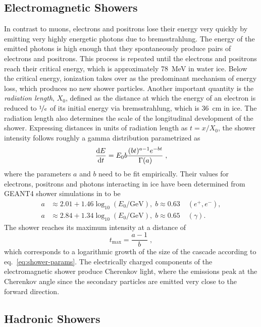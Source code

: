 \subsection{Electromagnetic Showers}

In contrast to muons, electrons and positrons lose their energy very quickly by emitting very highly energetic photons due to bremsstrahlung. The energy of the emitted photons is high enough that they spontaneously produce pairs of electrons and positrons. This process is repeated until the electrons and positrons reach their critical energy, which is approximately 78~MeV in water ice. Below the critical energy, ionization takes over as the predominant mechanism of energy loss, which produces no new shower particles. Another important quantity is the \emph{radiation length}, $X_0$, defined as the distance at which the energy of an electron is reduced to $\nicefrac{1}{e}$ of its initial energy via bremsstrahlung, which is 36~cm in ice\cite{pdg}. The radiation length also determines the scale of the longitudinal development of the shower. Expressing distances in units of radiation length as $t=x/X_0$, the shower intensity follows roughly a gamma distribution parametrized as 
\begin{equation}
    \frac{\mathrm{d} E}{\mathrm{d} t} = E_0 b \frac{(bt)^{a-1}e^{-bt}}{\Gamma(a)}\;,
\end{equation}
where the parameters $a$ and $b$ need to be fit empirically\cite{pdg}. Their values for electrons, positrons and photons interacting in ice have been determined from GEANT4 shower simulations in to be 
\begin{align}
    a &\approx 2.01 + 1.46 \log_{10}(E_0/\mathrm{GeV}),\; b\approx 0.63\; & (e^+,e^-), \\
    a &\approx 2.84 + 1.34 \log_{10}(E_0/\mathrm{GeV}),\; b\approx 0.65\; & (\gamma).\label{eq:shower-params}
\end{align}
The shower reaches its maximum intensity at a distance of
\begin{equation}
    t_{\mathrm{max}}=\frac{a-1}{b}\;,
\end{equation}
which corresponds to a logarithmic growth of the size of the cascade according to eq.~\ref{eq:shower-params}. The electrically charged components of the electromagnetic shower produce Cherenkov light, where the emissions peak at the Cherenkov angle since the secondary particles are emitted very close to the forward direction.

\subsection{Hadronic Showers}

